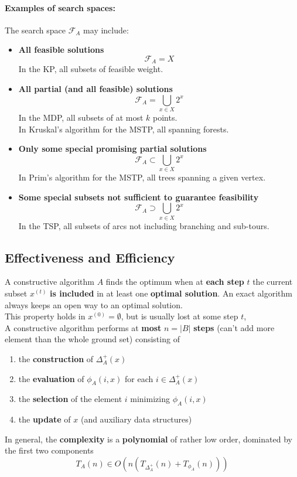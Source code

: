 \paragraph{Examples of search spaces:} The search space $\mathcal{F}_A$ may include:
\begin{itemize}
	\item \textbf{All feasible solutions}
	$$ \mathcal{F}_A = X $$
	In the KP, all subsets of feasible weight.\\
	
	\item \textbf{All partial (and all feasible) solutions}
	$$ \mathcal{F}_A = \bigcup_{x \in X} 2^x $$
	In the MDP, all subsets of at most $k$ points.\\
	In Kruskal's algorithm for the MSTP, all spanning forests.\\
	
	\item \textbf{Only some special promising partial solutions}
	$$ \mathcal{F}_A \subset \bigcup_{x \in X} 2^x $$
	In Prim's algorithm for the MSTP, all trees spanning a given vertex.\\
	
	\item \textbf{Some special subsets not sufficient to guarantee feasibility}
	$$ \mathcal{F}_A \supset \bigcup_{x \in X} 2^x $$
	In the TSP, all subsets of arcs not including branching and sub-tours.\\
\end{itemize}

\newpage

\subsection{Effectiveness and Efficiency}
A constructive algorithm $A$ finds the optimum when at \textbf{each step} $t$ the current subset $x^{(t)}$ \textbf{is included} in at least one \textbf{optimal solution}. An exact algorithm always keeps an open way to an optimal solution.\\
This property holds in $x^{(0)} = \emptyset$, but is usually lost at some step $t$,\\

A constructive algorithm performs at \textbf{most} $n = |B|$ \textbf{steps} (can't add more element than the whole ground set) consisting of 
\begin{enumerate}
	\item the \textbf{construction} of $\Delta_A^+ (x)$
	\item the \textbf{evaluation} of $\phi_A (i,x)$ for each $i \in \Delta_A^+(x)$
	\item the \textbf{selection} of the element $i$ minimizing $\phi_A (i,x)$
	\item the \textbf{update} of $x$ (and auxiliary data structures)
\end{enumerate}
In general, the \textbf{complexity} is a \textbf{polynomial} of rather low order, dominated by the first two components
$$ T_A (n) \in O\left(n \left(T_{\Delta_A^+} (n) + T_{\phi_A} (n)\right)\right) $$

